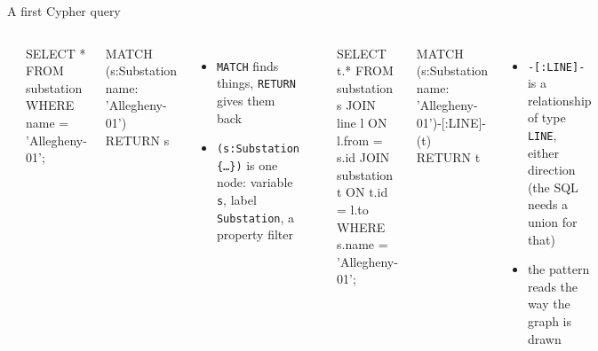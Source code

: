\documentclass[aspectratio=169, 10pt]{beamer}
\begin{document}
\begin{frame}[fragile]{A first Cypher query}
  \vspace{0.2cm}
  \begin{columns}[T]
      \\[4pt]
      \begin{code}[SQL]
SELECT *
FROM substation
WHERE name = 'Allegheny-01';
      \end{code}
      \begin{code}
MATCH (s:Substation {name: 'Allegheny-01'})
RETURN s
      \end{code}
      \small
      \begin{itemize}
        \item \texttt{MATCH} finds things, \texttt{RETURN} gives them back
        \item \texttt{(s:Substation \{\ldots\})} is one node: variable \texttt{s}, label \texttt{Substation}, a property filter
      \end{itemize}
      \\[4pt]
      \begin{code}[SQL]
SELECT t.*
FROM substation s
JOIN line l       ON l.from = s.id
JOIN substation t ON t.id = l.to
WHERE s.name = 'Allegheny-01';
      \end{code}
      \begin{code}
MATCH (s:Substation {name: 'Allegheny-01'})-[:LINE]-(t)
RETURN t
      \end{code}
      \small
      \begin{itemize}
        \item \texttt{-[:LINE]-} is a relationship of type \texttt{LINE}, either direction (the SQL needs a union for that)
        \item the pattern reads the way the graph is drawn
      \end{itemize}
  \end{columns}
\end{frame}
\end{document}
